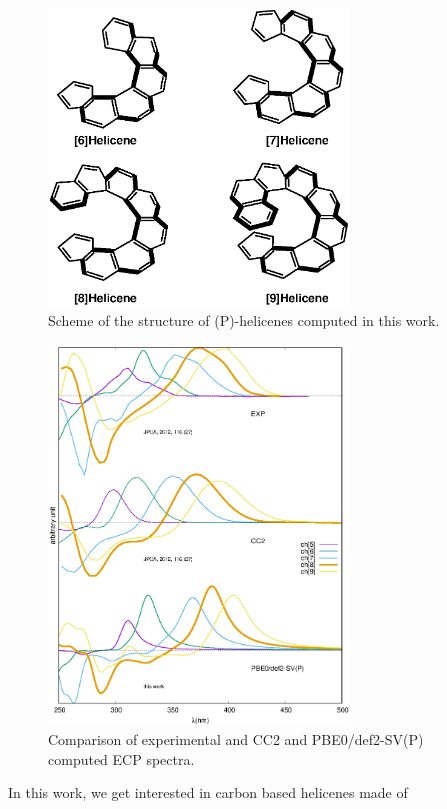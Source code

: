 \documentclass[aip]{revtex4-1}
\begin{document}
\begin{figure}
\begin{center}
\includegraphics[width=8cm]{helicene.eps}
\end{center}
\vspace{0.25in}
\hspace*{3in}
\caption{Scheme of the structure of (P)-helicenes computed in this work.}
\label{fig:helicene}
\end{figure}
\begin{figure}
\begin{center}
\includegraphics[width=8cm]{comparison_EXP_CC2_DFT.eps}
\end{center}
\caption{\label{fig:comparison_EXP_CC2_DFT} 
Comparison of experimental and CC2 and PBE0/def2-SV(P) computed ECP spectra.
}
\end{figure}
In this work, we get interested in carbon based helicenes made of
\end{document}
